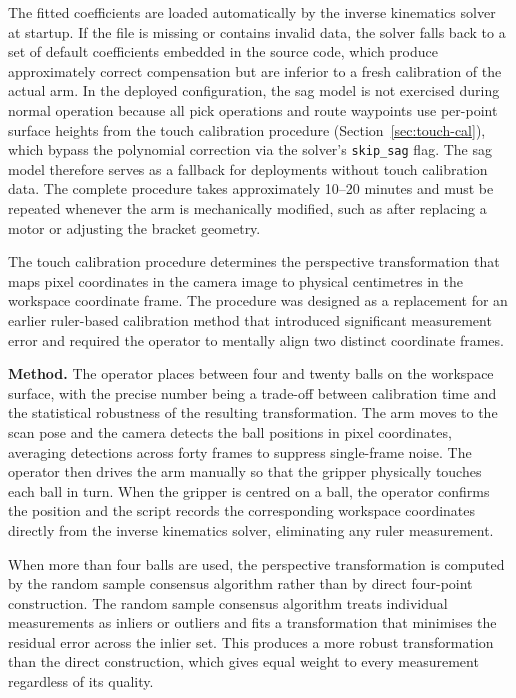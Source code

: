 The fitted coefficients are loaded automatically by the inverse 
kinematics solver at startup. If the file is missing or contains 
invalid data, the solver falls back to a set of default 
coefficients embedded in the source code, which produce 
approximately correct compensation but are inferior to a fresh 
calibration of the actual arm. In the deployed configuration, 
the sag model is not exercised during normal operation because 
all pick operations and route waypoints use per-point surface 
heights from the touch calibration procedure 
(Section~\ref{sec:touch-cal}), which bypass the polynomial correction via the 
solver's \texttt{skip\_sag} flag. The sag model therefore serves 
as a fallback for deployments without touch calibration data. 
The complete procedure takes approximately 10--20 minutes and 
must be repeated whenever the arm is mechanically modified, such 
as after replacing a motor or adjusting the bracket geometry.

\label{sec:touch-cal}

The touch calibration procedure determines the perspective 
transformation that maps pixel coordinates in the camera image 
to physical centimetres in the workspace coordinate frame. The 
procedure was designed as a replacement for an earlier 
ruler-based calibration method that introduced significant 
measurement error and required the operator to mentally align 
two distinct coordinate frames.

\textbf{Method.} The operator places between four and twenty 
balls on the workspace surface, with the precise number being a 
trade-off between calibration time and the statistical 
robustness of the resulting transformation. The arm moves to 
the scan pose and the camera detects the ball positions in 
pixel coordinates, averaging detections across forty frames to 
suppress single-frame noise. The operator then drives the arm 
manually so that the gripper physically touches each ball in 
turn. When the gripper is centred on a ball, the operator 
confirms the position and the script records the corresponding 
workspace coordinates directly from the inverse kinematics 
solver, eliminating any ruler measurement.

When more than four balls are used, the perspective 
transformation is computed by the random sample consensus 
algorithm \cite{fischler1981} rather than by direct 
four-point construction. The random sample consensus algorithm 
treats individual measurements as inliers or outliers and fits 
a transformation that minimises the residual error across the 
inlier set. This produces a more robust transformation than 
the direct construction, which gives equal weight to every 
measurement regardless of its quality.

